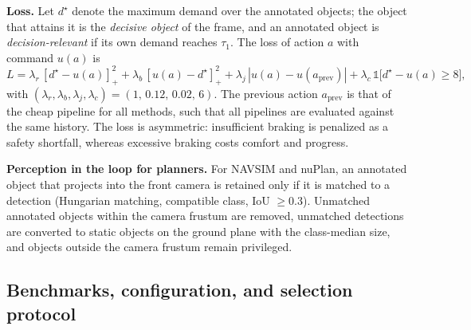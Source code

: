 \documentclass[10pt,letterpaper]{article}
\newcommand{\dem}{d}
\theoremstyle{remark}
\theoremstyle{plain}
\theoremstyle{definition}
\begin{document}
\noindent\textbf{Loss.}
Let $\dem^\star$ denote the maximum demand over the annotated objects; the object that attains it is the \emph{decisive object} of the frame, and an annotated object is \emph{decision-relevant} if its own demand reaches $\tau_1$.
The loss of action $a$ with command $u(a)$ is
\begin{equation}
L = \lambda_r\,[\dem^\star-u(a)]_+^2 + \lambda_b\,[u(a)-\dem^\star]_+^2
 + \lambda_j\,|u(a)-u(a_{\mathrm{prev}})| + \lambda_c\,\mathbb{1}\big[\dem^\star-u(a)\ge 8\big],
\label{eq:s_loss}
\end{equation}
with $(\lambda_r,\lambda_b,\lambda_j,\lambda_c)=(1,\,0.12,\,0.02,\,6)$.
The previous action $a_{\mathrm{prev}}$ is that of the cheap pipeline for all methods, such that all pipelines are evaluated against the same history.
The loss is asymmetric: insufficient braking is penalized as a safety shortfall, whereas excessive braking costs comfort and progress.

\noindent\textbf{Perception in the loop for planners.}
For NAVSIM and nuPlan, an annotated object that projects into the front camera is retained only if it is matched to a detection (Hungarian matching, compatible class, IoU $\ge0.3$). Unmatched annotated objects within the camera frustum are removed, unmatched detections are converted to static objects on the ground plane with the class-median size, and objects outside the camera frustum remain privileged.

\subsection{Benchmarks, configuration, and selection protocol}
\label{sec:supp_config}
\end{document}

